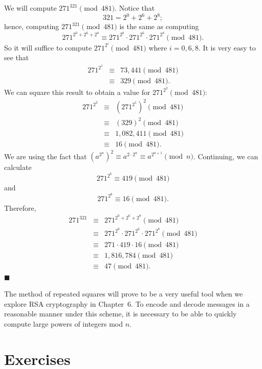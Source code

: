  
\medskip
 
 
We will compute $271^{321} \pmod{ 481}$. Notice that
$$
321 = 2^0 +2^6 + 2^8;
$$
hence, computing $271^{ 321} \pmod{ 481}$ is the same as computing
$$
271^{ 2^0 +2^6 + 2^8 } \equiv 271^{ 2^0 } \cdot 271^{
2^6 } \cdot 271^{ 2^8 } \pmod{ 481}.
$$
So it will suffice to compute $271^{ 2^i } \pmod{ 481}$ where $i = 0,
6, 8$. It is very easy to see that 
\begin{eqnarray*}
271^{ 2^1}  & \equiv & 73,441 \pmod{ 481}  \\
& \equiv & 329 \pmod{ 481}.
\end{eqnarray*}
We can square this result to obtain a value for $271^{ 2^2} \pmod{
481}$: 
\begin{eqnarray*}
271^{ 2^2}  & \equiv & (271^{ 2^1})^2 \pmod{ 481}
\\ & \equiv & (329)^2 \pmod{ 481} \\
& \equiv & 1,082,411 \pmod{ 481} \\
& \equiv & 16 \pmod{ 481}.
\end{eqnarray*}
We are using the fact that $(a^{2^n})^2  \equiv a^{2 \cdot 2^n} \equiv
a^{ 2^{n+1} } \pmod{ n}$. Continuing, we can calculate
$$
271^{ 2^6 } \equiv 419 \pmod{ 481}
$$
and
$$
271^{ 2^8 }  \equiv 16 \pmod{ 481}.
$$
Therefore,
\begin{eqnarray*}
271^{ 321}
& \equiv & 271^{ 2^0 +2^6 + 2^8 } \pmod{ 481} \\
& \equiv & 271^{ 2^0 } \cdot 271^{ 2^6 } \cdot 271^{ 2^8 }
\pmod{ 481} \\
& \equiv & 271 \cdot 419 \cdot 16 \pmod{ 481} \\
& \equiv & 1,816,784 \pmod{ 481} \\
& \equiv & 47 \pmod{ 481}.
\end{eqnarray*}
\hspace{\fill} $\blacksquare$
 
 
The method of repeated squares will prove to be a very useful tool
when we explore  RSA cryptography  in Chapter~6. To encode and decode
messages in a reasonable manner under this scheme, it is necessary to
be able to quickly compute large powers of integers mod $n$.
 
 
\section*{Exercises}
\exrule
 
 
 
